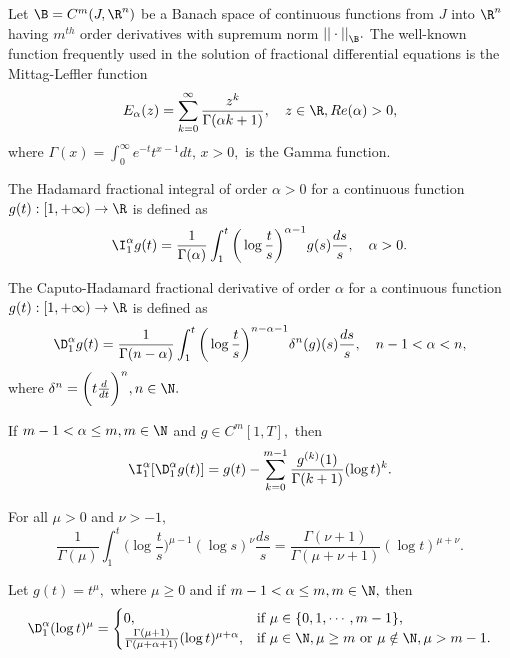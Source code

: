 Let $\B=C^m(J,{\R}^{n})$ be a Banach space of continuous functions from $J$ into ${\R}^{n}$ having $m^{th}$ order derivatives with supremum norm ${||\cdot||}_{\B}.$ The well-known function frequently used in the solution of fractional differential equations is the Mittag-Leffler function
\begin{equation}\label{ml}
E_{\alpha}(z)=\sum_{k=0}^{\infty}\frac{z^k}{\Gamma(\alpha k+1)},\quad z\in\R,Re(\alpha)>0,
\end{equation}
where $\Gamma(x)=\int_{0}^{\infty}e^{-t}t^{x-1}dt,\,x>0,$ is the Gamma function.
\begin{defn}\cite{kst}\label{hi}
The Hadamard fractional integral of order $\alpha>0$ for a continuous function $g(t):[1,+\infty)\to\R$ is defined as
\begin{equation}\label{hi} \I_{1}^{\alpha}g(t)=\frac{1}{\Gamma(\alpha)}\int_{1}^{t}\bigg(\log{\frac{t}{s}}\bigg)^{\alpha-1}g(s)\frac{ds}{s},\quad \alpha>0.
\end{equation}
\end{defn}
\begin{defn}\cite{kst}\label{chd}
The Caputo-Hadamard fractional derivative of order $\alpha$ for a continuous function $g(t):[1,+\infty)\to\R$ is defined as
\begin{equation}\label{ch}
\D_{1}^{\alpha}g(t)=\frac{1}{\Gamma(n-\alpha)}\int_{1}^{t}\bigg(\log{\frac{t}{s}}\bigg)^{n-\alpha-1}\delta^{n}( g)(s)\frac{ds}{s},\quad n-1<\alpha<n,
\end{equation}
where $\delta^n=\bigg(t\frac{d}{dt}\bigg)^{n},n\in\N.$
\end{defn}
\begin{lem}\cite{kst}\label{l1}
If $m-1<\alpha\leq m,m\in\N$ and $g\in C^m[1,T],$ then
\begin{equation*}
\I_{1}^{\alpha}[\D_{1}^{\alpha}g(t)]=g(t)-\sum_{k=0}^{m-1}\frac{g^{(k)}(1)}{\Gamma(k+1)}(\log{t})^k.
\end{equation*}
\end{lem}
\begin{lem}\cite{kst}\label{l2}
For all $\mu>0$ and $\nu>-1,$
\begin{equation*}
\frac{1}{\Gamma(\mu)}\int_{1}^{t}\bigg(\log{\frac{t}{s}}\bigg)^{\mu-1}(\log{s})^{\nu}\frac{ds}{s}=\frac{\Gamma(\nu+1)}{\Gamma(\mu+\nu+1)}(\log{t})^{\mu+\nu}.
\end{equation*}
\end{lem}
\begin{lem}\cite{kst}\label{l3}
Let $g(t)=t^{\mu},$ where $\mu\geq0$ and if $m-1<\alpha\leq m,m\in\N,$ then
\begin{equation*}
\D_{1}^{\alpha}(\log{t})^{\mu}=\begin{cases}
0, & \mbox{if}\,\,\mu\in\{0,1,\cdots,m-1\},\\
\frac{\Gamma(\mu+1)}{\Gamma(\mu+\alpha+1)}(\log{t})^{\mu+\alpha}, &\mbox{if}\,\, \mu\in\N,\mu\geq m\,\,\mbox{or}\,\,\mu\notin\N,\mu>m-1.
\end{cases}
\end{equation*}
\end{lem}
